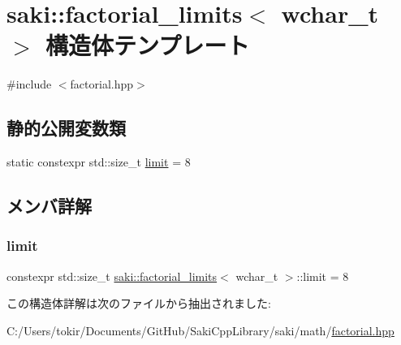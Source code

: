 \hypertarget{structsaki_1_1factorial__limits_3_01wchar__t_01_4}{}\section{saki\+:\+:factorial\+\_\+limits$<$ wchar\+\_\+t $>$ 構造体テンプレート}
\label{structsaki_1_1factorial__limits_3_01wchar__t_01_4}


{\ttfamily \#include $<$factorial.\+hpp$>$}

\subsection*{静的公開変数類}
\begin{DoxyCompactItemize}
\item 
static constexpr std\+::size\+\_\+t \mbox{\hyperlink{structsaki_1_1factorial__limits_3_01wchar__t_01_4_aade4c8bce731426a40eea44505e40298}{limit}} = 8
\end{DoxyCompactItemize}


\subsection{メンバ詳解}
\mbox{\label{structsaki_1_1factorial__limits_3_01wchar__t_01_4_aade4c8bce731426a40eea44505e40298}} 
\subsubsection{\texorpdfstring{limit}{limit}}
{\footnotesize\ttfamily constexpr std\+::size\+\_\+t \mbox{\hyperlink{structsaki_1_1factorial__limits}{saki\+::factorial\+\_\+limits}}$<$ wchar\+\_\+t $>$\+::limit = 8\hspace{0.3cm}{\ttfamily [static]}}



この構造体詳解は次のファイルから抽出されました\+:\begin{DoxyCompactItemize}
\item 
C\+:/\+Users/tokir/\+Documents/\+Git\+Hub/\+Saki\+Cpp\+Library/saki/math/\mbox{\hyperlink{factorial_8hpp}{factorial.\+hpp}}\end{DoxyCompactItemize}
